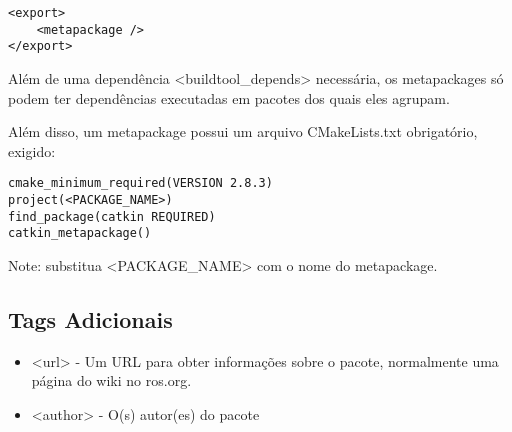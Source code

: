 \begin{verbatim}
<export>
	<metapackage />
</export>
\end{verbatim}


Além de uma dependência <buildtool\_depends> necessária, os metapackages só podem ter dependências executadas em pacotes dos quais eles agrupam.

Além disso, um metapackage possui um arquivo CMakeLists.txt obrigatório, exigido:

\begin{verbatim}
cmake_minimum_required(VERSION 2.8.3)
project(<PACKAGE_NAME>)
find_package(catkin REQUIRED)
catkin_metapackage()
\end{verbatim}

Note: substitua <PACKAGE\_NAME> com o nome do metapackage. 

\subsection{Tags Adicionais}

\begin{itemize}
	\setlength{\itemsep}{1pt}
	\setlength{\parskip}{0pt}
	\setlength{\parsep}{0pt}
	\item <url> - Um URL para obter informações sobre o pacote, normalmente uma página do wiki no ros.org.
	\item <author> - O(s) autor(es) do pacote 
\end{itemize}